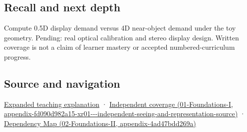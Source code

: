 \subsection{Recall and next depth}\label{appendix-f90cee1be7a4-recall-and-next-depth}

Compute 0.5D display demand versus 4D near-object demand under the toy geometry. Pending: real optical calibration and stereo display design. Written coverage is not a claim of learner mastery or accepted numbered-curriculum progress.

\subsection{Source and navigation}\label{appendix-f90cee1be7a4-source-and-navigation}

\hyperref[04-visual-computing-ii-ch042-focus-and-stereo-can-disagree-even-when-the-images-are-sharp]{Expanded teaching explanation} · \href{../01-Foundations-I/main.pdf\#nameddest=appendix-fd090d982a15-xr01---independent-seeing-and-representation-source}{Independent coverage (01-Foundations-I, appendix-fd090d982a15-xr01-\/-\/-independent-seeing-and-representation-source)} · \href{../02-Foundations-II/main.pdf\#nameddest=appendix-4ad47bdd269a}{Dependency Map (02-Foundations-II, appendix-4ad47bdd269a)}
